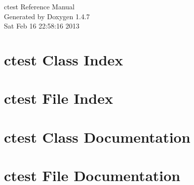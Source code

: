 \documentclass[a4paper]{book}
\begin{document}
\begin{titlepage}
\vspace*{7cm}
\begin{center}
{\Large ctest Reference Manual}\\
\vspace*{1cm}
{\large Generated by Doxygen 1.4.7}\\
\vspace*{0.5cm}
{\small Sat Feb 16 22:58:16 2013}\\
\end{center}
\end{titlepage}
\clearemptydoublepage
{}
\tableofcontents
\clearemptydoublepage
{}
\chapter{ctest Class Index}

\chapter{ctest File Index}

\chapter{ctest Class Documentation}




\chapter{ctest File Documentation}










\printindex
\end{document}
